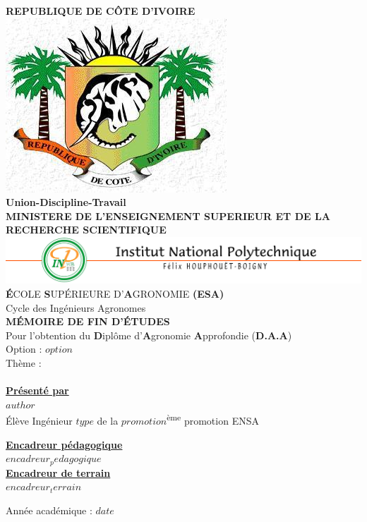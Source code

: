 \documentclass[12pt,$if(lang)$$babel-lang$,$endif$$if(papersize)$$papersize$paper,$endif$$for(classoption)$$classoption$$sep$,$endfor$]{$documentclass$}
\begin{document}


\begin{center}
  \small{\textbf{REPUBLIQUE DE CÔTE D'IVOIRE}} \\
  \includegraphics[width=0.2\columnwidth]{images/union-discipline-travail.png} \\
  \scriptsize{\textbf{Union-Discipline-Travail}} \\
  \small{\textbf{MINISTERE DE L'ENSEIGNEMENT SUPERIEUR ET DE LA RECHERCHE SCIENTIFIQUE}} \\
  \includegraphics[]{images/INPHB.png}
  \textbf{É}COLE \textbf{S}UPÉRIEURE D’\textbf{A}GRONOMIE \textbf{(ESA)} \\
  \small{Cycle des Ingénieurs Agronomes} \\
  \vspace*{\fill}
  \Large{\textbf{MÉMOIRE DE FIN D’ÉTUDES}} \\
  \small{Pour l’obtention du \textbf{D}iplôme d’\textbf{A}gronomie \textbf{A}pprofondie (\textbf{D.A.A})} \\
  \vspace*{\fill}
  Option : \textbf{$option$} \\
  \vspace*{\fill}
  Thème : \\
   \\
  \vspace*{\fill}
  \small{\underline{\textbf{Présenté par}}} \\
  \small{\textbf{$author$}} \\
  \small{Élève Ingénieur $type$ de la $promotion$\textsuperscript{ème} promotion ENSA} \\
  \vspace*{\fill}
  \begin{multicols}{2}
    \small{\underline{\textbf{Encadreur pédagogique}}} \\
    \small{\textbf{$encadreur_pedagogique$}} \\
    \columnbreak
    \small{\underline{\textbf{Encadreur de terrain}}} \\
    \small{\textbf{$encadreur_terrain$}} \\
  \end{multicols}
  \vspace*{\fill}
  \small{Année académique : $date$} \\
\end{center}
\end{document}
